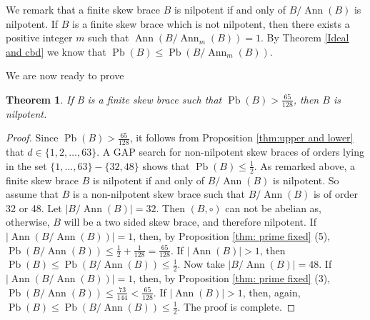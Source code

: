 \documentclass[oneside]{amsart}
\numberwithin{equation}{section}
\theoremstyle{plain}
\newtheorem{thm}[equation]{Theorem}
\theoremstyle{definition}
\newcommand{\Pb}{\operatorname{Pb} }
\newcommand{\Ann}{\operatorname{Ann} }
\begin{document}
 We  remark that a finite skew brace $B$ is nilpotent if and only of $B/\Ann(B)$ is nilpotent. 
If $B$ is a finite skew brace which is not nilpotent, then there exists a positive  integer $m$ such that $\Ann(B/\Ann_m(B)) = 1$. By Theorem \ref{Ideal and cbd} we know that $\Pb(B) \leqslant \Pb(B/\Ann_m(B))$.




 We are now ready to prove
 
 \begin{thm}   \label{13/14 nilpotent}
    If B is a finite skew brace such that $\Pb(B) > \frac{65}{128}$, then $B$ is nilpotent.
\end{thm}
\begin{proof}
 Since $\Pb(B)> \frac{65}{128}$, it follows from Proposition \ref{thm:upper and lower} that $d \in \{1, 2, \ldots, 63\}$. A GAP search for non-nilpotent skew braces of orders lying in the set $\{1, \ldots, 63\} - \{32, 48\}$ shows that $\Pb(B) \le \frac{1}{2}$. As remarked above, a finite skew brace $B$ is nilpotent if and only of $B/\Ann(B)$ is nilpotent. So assume that $B$ is a non-nilpotent skew brace such that $B/\Ann(B)$ is of order 32 or 48. Let $|B/\Ann(B)| = 32$. Then $(B, \circ)$ can not be abelian as, otherwise, $B$ will be a two sided skew brace, and therefore nilpotent.  If $|\Ann(B/\Ann(B))| = 1$, then, by Proposition \ref{thm:  prime fixed} (5), $\Pb(B/\Ann(B)) \leqslant  \frac{1}{2} + \frac{1}{128} = \frac{65}{128}$. If $|\Ann(B)| > 1$, then $\Pb(B) \le \Pb(B/\Ann(B)) \leqslant \frac{1}{2}$. Now take  $|B/\Ann(B)| = 48$. If $|\Ann(B/\Ann(B))| = 1$, then, by Proposition \ref{thm:  prime fixed} (3), $\Pb(B/\Ann(B)) \leqslant  \frac{73}{144} < \frac{65}{128}$. If  $|\Ann(B)| > 1$, then, again,  $\Pb(B) \le \Pb(B/\Ann(B)) \leqslant \frac{1}{2}$. The proof is complete.
\end{proof}
\end{document}
